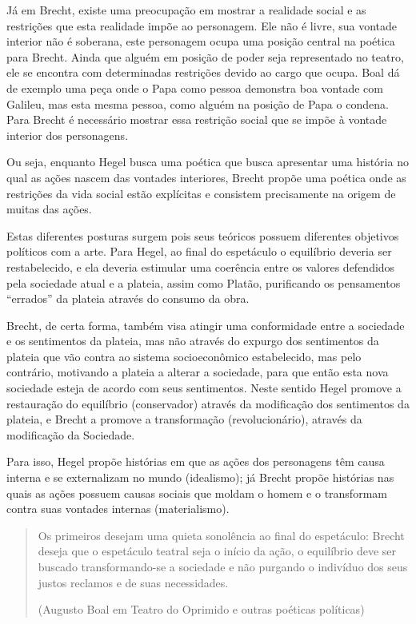 Já em Brecht, existe uma preocupação em mostrar a realidade social e as restrições que esta realidade impõe ao personagem. Ele não é livre, sua vontade interior não é soberana, este personagem ocupa uma posição central na poética para Brecht. Ainda que alguém em posição de poder seja representado no teatro, ele se encontra com determinadas restrições devido ao cargo que ocupa. Boal dá de exemplo uma peça onde o Papa como pessoa demonstra boa vontade com Galileu, mas esta mesma pessoa, como alguém na posição de Papa o condena. Para Brecht é necessário mostrar essa restrição social que se impõe à vontade interior dos personagens.

Ou seja, enquanto Hegel busca uma poética que busca apresentar uma história no qual as ações nascem das vontades interiores, Brecht propõe uma poética onde as restrições da vida social estão explícitas e consistem precisamente na origem de muitas das ações.

Estas diferentes posturas surgem pois seus teóricos possuem diferentes objetivos políticos com a arte. Para Hegel, ao final do espetáculo o equilíbrio deveria ser restabelecido, e ela deveria estimular uma coerência entre os valores defendidos pela sociedade atual e a plateia, assim como Platão, purificando os pensamentos “errados” da plateia através do consumo da obra.

Brecht, de certa forma,  também visa atingir uma conformidade entre a sociedade e os sentimentos da plateia, mas não através do expurgo dos sentimentos da plateia que vão contra ao sistema socioeconômico estabelecido, mas pelo contrário, motivando a plateia a alterar a sociedade, para que então esta nova sociedade esteja de acordo com seus sentimentos. Neste sentido Hegel promove a restauração do equilíbrio (conservador) através da modificação dos sentimentos da plateia, e Brecht a promove a transformação (revolucionário), através da modificação da Sociedade.

Para isso, Hegel propõe histórias em que as ações dos personagens têm causa interna e se externalizam no mundo (idealismo); já Brecht propõe histórias nas quais as ações possuem causas sociais que moldam o homem e o transformam contra suas vontades internas (materialismo).

\begin{quote}
Os primeiros desejam uma quieta sonolência ao final do espetáculo: Brecht deseja que o espetáculo teatral seja o início da ação, o equilíbrio deve ser buscado transformando-se a sociedade e não purgando o indivíduo dos seus justos reclamos e de suas necessidades.

(Augusto Boal em Teatro do Oprimido e outras poéticas políticas)
\end{quote}


